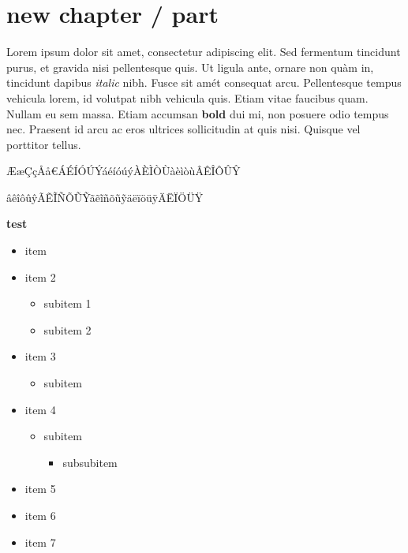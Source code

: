 \documentclass{report}
\begin{document}
\part{new chapter / part}

Lorem ipsum dolor sit amet, consectetur adipiscing elit. Sed fermentum tincidunt purus, et gravida nisi pellentesque quis. Ut ligula ante, ornare non qu{\`a}m in, tincidunt dapibus \textit{italic} nibh. Fusce sit am{\'e}t consequat arcu. Pellentesque tempus vehicula lorem, id volutpat nibh vehicula quis. Etiam vitae faucibus quam. Nullam eu sem massa. Etiam accumsan \textbf{bold} dui mi, non posuere odio tempus nec. Praesent id arcu ac eros ultrices sollicitudin at quis nisi. Quisque vel porttitor tellus.

{\AE{}}{\ae{}}{\c{C}}{\c{c}}{\r{A}}{\r{a}}{\euro{}}{\'A}{\'E}{\'I}{\'O}{\'U}{\'Y}{\'a}{\'e}{\'i}{\'o}{\'u}{\'y}{\`A}{\`E}{\`I}{\`O}{\`U}{\`a}{\`e}{\`i}{\`o}{\`u}{\^A}{\^E}{\^I}{\^O}{\^U}{\^Y}

{\^a}{\^e}{\^i}{\^o}{\^u}{\^y}{\~A}{\~E}{\~I}{\~N}{\~O}{\~U}{\~Y}{\~a}{\~e}{\~i}{\~n}{\~o}{\~u}{\~y}{\"a}{\"e}{\"i}{\"o}{\"u}{\"y}{\"A}{\"E}{\"I}{\"O}{\"U}{\"Y}

\textbf{test}

\begin{itemize}
    \item item
    \item item 2
    \begin{itemize}
        \item subitem 1
        \item subitem 2
    \end{itemize}
    \item item 3
    \begin{itemize}
        \item subitem
    \end{itemize}
    \item item 4
    \begin{itemize}
        \item subitem
        \begin{itemize}
            \item subsubitem
        \end{itemize}
    \end{itemize}
    \item item 5
    \item item 6
    \item item 7

\end{itemize}
\end{document}

